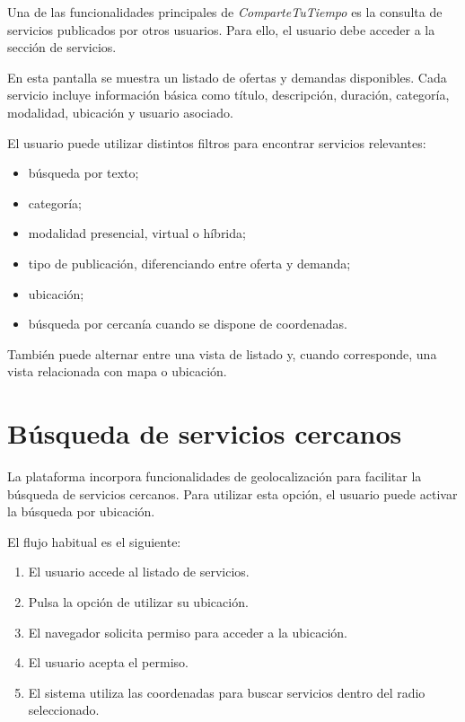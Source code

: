 Una de las funcionalidades principales de \textit{ComparteTuTiempo} es la consulta de servicios publicados por otros usuarios. Para ello, el usuario debe acceder a la sección de servicios.

En esta pantalla se muestra un listado de ofertas y demandas disponibles. Cada servicio incluye información básica como título, descripción, duración, categoría, modalidad, ubicación y usuario asociado.

El usuario puede utilizar distintos filtros para encontrar servicios relevantes:

\begin{itemize}
    \item búsqueda por texto;
    \item categoría;
    \item modalidad presencial, virtual o híbrida;
    \item tipo de publicación, diferenciando entre oferta y demanda;
    \item ubicación;
    \item búsqueda por cercanía cuando se dispone de coordenadas.
\end{itemize}

También puede alternar entre una vista de listado y, cuando corresponde, una vista relacionada con mapa o ubicación.

\section{Búsqueda de servicios cercanos}

La plataforma incorpora funcionalidades de geolocalización para facilitar la búsqueda de servicios cercanos. Para utilizar esta opción, el usuario puede activar la búsqueda por ubicación.

El flujo habitual es el siguiente:

\begin{enumerate}
    \item El usuario accede al listado de servicios.
    \item Pulsa la opción de utilizar su ubicación.
    \item El navegador solicita permiso para acceder a la ubicación.
    \item El usuario acepta el permiso.
    \item El sistema utiliza las coordenadas para buscar servicios dentro del radio seleccionado.
\end{enumerate}

